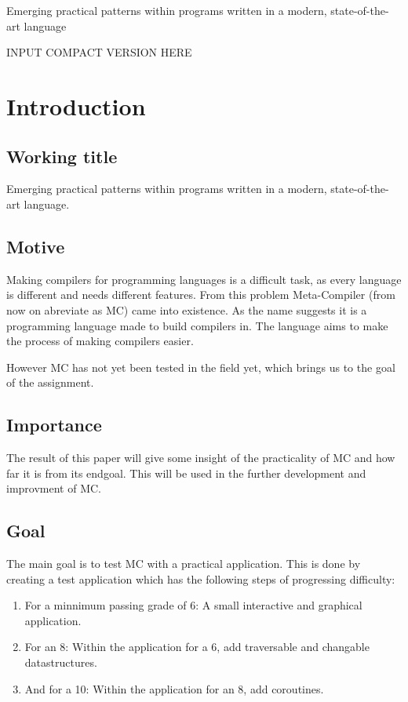

Emerging practical patterns within programs written in a modern, state-of-the-art language

INPUT COMPACT VERSION HERE



\chapter{Introduction}
\section{Working title}
Emerging practical patterns within programs written in a modern, state-of-the-art language.

\section{Motive}\label{sec:motivemandate}
Making compilers for programming languages is a difficult task, as every language is different and needs different features.
From this problem Meta-Compiler (from now on abreviate as MC) came into existence.
As the name suggests it is a programming language made to build compilers in.
The language aims to make the process of making compilers easier.

However MC has not yet been tested in the field yet, which brings us to the goal of the assignment.

\section{Importance}
The result of this paper will give some insight of the practicality of MC and how far it is from its endgoal.
This will be used in the further development and improvment of MC.

\section{Goal}\label{sec:goalsmandate}
The main goal is to test MC with a practical application.
This is done by creating a test application which has the following steps of progressing difficulty:

\begin{enumerate}
   \item For a minnimum passing grade of 6: \newline
      A small interactive and graphical application.
   \item For an 8: \newline
      Within the application for a 6, add traversable and changable datastructures.
   \item And for a 10: \newline
      Within the application for an 8, add coroutines.
\end{enumerate}

